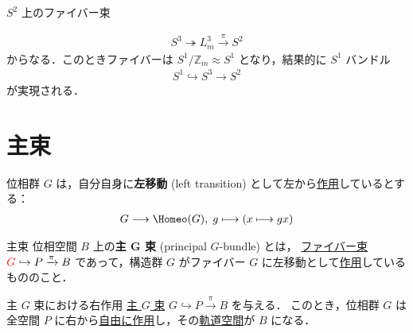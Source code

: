 \documentclass[algtopo_main]{subfiles}
\begin{document}
\begin{myexample}[]{$S^2$ 上のファイバー束}
\begin{description}
        \begin{align}
            S^3 \twoheadrightarrow L^3_m \xrightarrow{\pi} S^2
        \end{align}
        からなる．このときファイバーは $S^1 / \mathbb{Z}_m \approx S^1$ となり，結果的に $S^1$ バンドル
        \begin{align}
            S^1 \hookrightarrow S^3 \to S^2
        \end{align}
        が実現される．
    \end{description}
\end{myexample}



\section{主束}

位相群 $G$ は，自分自身に\textbf{左移動} (left transition) として左から\hyperref[def:TG-action]{作用}しているとする：
\begin{align}
    G \lto \Homeo(G),\; g \lmto (x \lmto gx)
\end{align}

\begin{mydef}[label=def:GB]{主束}
    位相空間 $B$ 上の\textbf{主 $\bm{G}$ 束} (principal $G$-bundle) とは，
    \hyperref[def:FB]{ファイバー束} $\textcolor{red}{G} \hookrightarrow P \xrightarrow{\pi} B$ であって，構造群 $G$ がファイバー $G$ に左移動として\hyperref[def:TG-action]{作用}しているもののこと．
\end{mydef}

\begin{myprop}[label=prop:GB-right]{主 $G$ 束における右作用}
    \hyperref[def:GB]{主 $G$ 束} $G \hookrightarrow P \xrightarrow{\pi} B$ を与える．
    このとき，位相群 $G$ は全空間 $P$ に右から\hyperref[def:TG-action]{自由に作用}し，その\hyperref[def:TG-action]{軌道空間}が $B$ になる．
\end{myprop}
\end{document}
